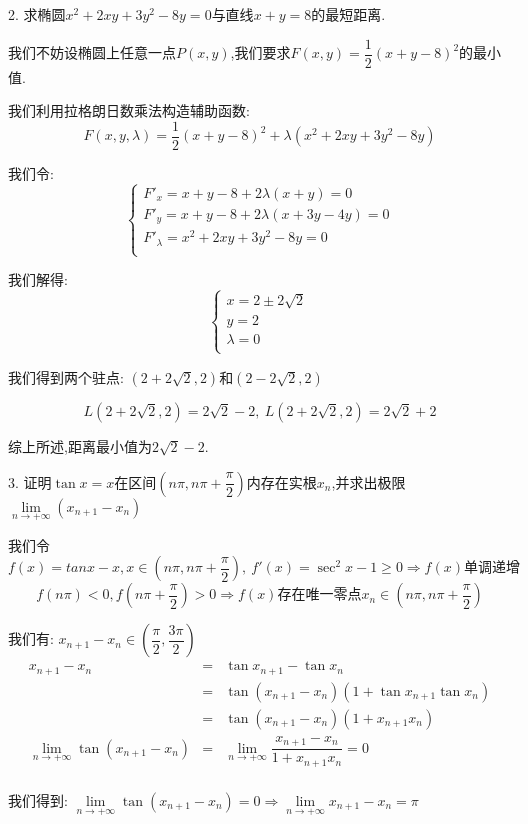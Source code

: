 2. 求椭圆$x^2+2xy+3y^2-8y=0$与直线$x+y=8$的最短距离.
\begin{solution}
	
	我们不妨设椭圆上任意一点$P(x,y)$,我们要求$F(x,y)=\dfrac{1}{2}(x+y-8)^2$的最小值.
	
	我们利用拉格朗日数乘法构造辅助函数: 
	$$F(x,y,\lambda)=\dfrac{1}{2}(x+y-8)^2+\lambda(x^2+2xy+3y^2-8y)$$
	
	我们令: $$\left\lbrace 
	\begin{array}{l}
		F'_{x}=x+y-8+2\lambda (x+y)=0\\
		F'_{y}=x+y-8+2\lambda(x+3y-4y)=0\\
		F'_{\lambda}=x^2+2xy+3y^2-8y=0\\
	\end{array}
	\right. $$
	
	我们解得: $$\left\lbrace 
	\begin{array}{l}
		x=2\pm 2\sqrt{2}\\
		y=2\\
		\lambda=0\\
	\end{array}
	\right. $$
	
	我们得到两个驻点: $(2+2\sqrt{2},2)$和$(2-2\sqrt{2},2)$
	
	$$L(2+2\sqrt{2},2)=2\sqrt{2}-2,\ L(2+2\sqrt{2},2)=2\sqrt{2}+2$$
	
	综上所述,距离最小值为$2\sqrt{2}-2$.
\end{solution}


3. 证明$\tan x=x$在区间$(n\pi,n\pi+\dfrac{\pi}{2})$内存在实根$x_{n}$,并求出极限$\lim\limits_{n\rightarrow +\infty}(x_{n+1}-x_{n})$
\begin{solution}
	
	我们令$f(x)=tan x-x,x\in(n\pi,n\pi+\dfrac{\pi}{2}),\ f'(x)=\sec^{2} x -1\geq 0\Rightarrow f(x)\text{单调递增}$
	$$f(n\pi)<0,f(n\pi+\dfrac{\pi}{2})>0\Rightarrow f(x)\text{存在唯一零点} x_{n}\in (n\pi,n\pi+\dfrac{\pi}{2})$$
	
	我们有: $x_{n+1}-x_{n}\in(\dfrac{\pi}{2},\dfrac{3\pi}{2})$
	\begin{eqnarray*}
		x_{n+1}-x_{n}&=&\tan x_{n+1}-\tan x_{n}\\
		&=&\tan(x_{n+1}-x_{n})(1+\tan x_{n+1}\tan x_{n})\\
		&=&\tan(x_{n+1}-x_{n})(1+x_{n+1}x_{n})\\
		\lim\limits_{n\rightarrow +\infty}\tan(x_{n+1}-x_{n})&=&\lim\limits_{n\rightarrow +\infty}\dfrac{x_{n+1}-x_{n}}{1+x_{n+1}x_{n}}=0\\
	\end{eqnarray*}
	
	我们得到: $\lim\limits_{n\rightarrow +\infty}\tan(x_{n+1}-x_{n})=0\Rightarrow \lim\limits_{n\rightarrow +\infty}x_{n+1}-x_{n}=\pi$
\end{solution}

